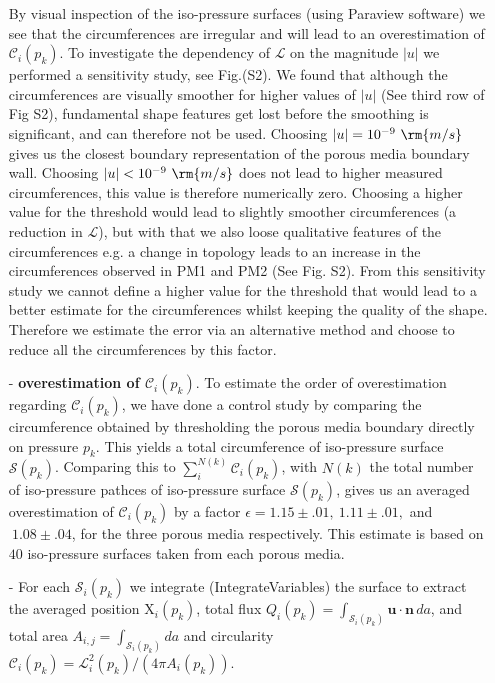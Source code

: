 \documentclass[draft,jgrga]{agutexSI2019}
\begin{document}
\begin{article}
\begin{itemize}
	By visual inspection of the iso-pressure surfaces (using Paraview software) we see that the circumferences are irregular and will lead to an overestimation of $\mathcal{C}_i(p_k)$. To investigate the dependency of $\mathcal{L}$ on the magnitude  $|u|$ we performed a sensitivity study, see Fig.(S2). We found that although the circumferences are visually smoother for higher values of $|u|$ (See third row of Fig S2), fundamental shape features get lost before the smoothing is significant, and can therefore not be used. Choosing $|u|= 10^{-9}~\rm{m/s}$ gives us the closest boundary representation of the porous media boundary wall. Choosing $|u| < 10^{-9}~\rm{m/s}$ does not lead to higher measured circumferences, this value is therefore numerically zero. Choosing a higher value for the threshold would lead to slightly smoother circumferences (a reduction in $\mathcal{L}$), but with that we also loose qualitative features of the circumferences e.g. a change in topology leads to an increase in the circumferences observed in PM1 and PM2 (See Fig. S2). From this sensitivity study we cannot define a higher value for the threshold that would lead to a better estimate for the circumferences whilst keeping the quality of the shape. Therefore we estimate the error via an alternative method and choose to reduce all the circumferences by this factor. 

	\item[-]{\textbf{overestimation of $\mathcal{C}_i(p_k)$}}. To estimate the order of overestimation regarding $\mathcal{C}_i(p_k)$, we have done a control study by comparing the circumference obtained by thresholding the porous media boundary directly on pressure $p_k$. This yields a total circumference of iso-pressure surface $\mathcal{S}(p_k)$. Comparing this to $\sum_i^{N(k)}\mathcal{C}_i(p_k)$, with $N(k)$ the total number of iso-pressure pathces of iso-pressure surface $\mathcal{S}(p_k)$, gives us an averaged overestimation of $\mathcal{C}_i(p_k)$  by a factor $\epsilon = 1.15\pm.01 ,~1.11\pm.01,$ and $~1.08\pm.04$, for the three porous media respectively. This estimate is based on $40$ iso-pressure surfaces taken from each porous media. 

	\item[-] For each $\mathcal{S}_i(p_k)$ we integrate (IntegrateVariables) the surface to extract the averaged position $\mathrm{X}_i(p_k)$, total flux $Q_i(p_k) = \int_{\mathcal{S}_i(p_k)}\mathbf{u}\cdot\mathbf{n}\,da$, and total area $A_{i,j}= \int_{\mathcal{S}_i(p_k)}da$ and circularity $\mathcal{C}_i(p_k) = \mathcal{L}^2_i(p_k)/(4\pi A_i(p_k))$. 
\end{itemize}




\end{article}
\end{document}
